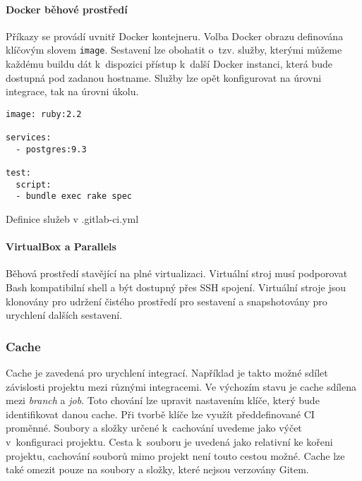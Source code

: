 \paragraph{Docker běhové prostředí}

Příkazy se provádí uvnitř Docker kontejneru.
Volba Docker obrazu definována klíčovým slovem \verb|image|.
Sestavení lze obohatit o~tzv. služby, kterými můžeme každému buildu dát k~dispozici přístup k~další Docker instanci, která bude dostupná pod zadanou hostname.
Služby lze opět konfigurovat na úrovni integrace, tak na úrovni úkolu.

\begin{listing}[ht]
\begin{verbatim}
image: ruby:2.2

services:
  - postgres:9.3

test:
  script:
  - bundle exec rake spec
\end{verbatim}
\caption{Definice služeb v .gitlab-ci.yml}
\end{listing}

\paragraph{VirtualBox a Parallels}

Běhová prostředí stavějící na plné virtualizaci.
Virtuální stroj musí podporovat Bash kompatibilní shell a být dostupný přes SSH spojení.
Virtuální stroje jsou klonovány pro udržení čistého prostředí pro sestavení a snapshotovány pro urychlení dalších sestavení.


\subsubsection{Cache}


Cache je zavedená pro urychlení integrací.
Například je takto možné sdílet závislosti projektu mezi různými integracemi.
Ve výchozím stavu je cache sdílena mezi \textit{branch} a \textit{job}.
Toto chování lze upravit nastavením klíče, který bude identifikovat danou cache.
Při tvorbě klíče lze využít předdefinované CI proměnné. 
Soubory a složky určené k~cachování uvedeme jako výčet v~konfiguraci projektu.
Cesta k~souboru je uvedená jako relativní ke kořeni projektu, cachování souborů mimo projekt není touto cestou možné. %
Cache lze také omezit pouze na soubory a složky, které nejsou verzovány Gitem.

